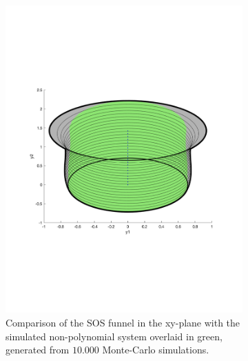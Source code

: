 \begin{figure}
  \begin{subfigure}{0.5\textwidth}
    \includegraphics[trim={0cm 6cm 0cm 6cm},
    width=\textwidth]{figures/method/FunnelSim1}
    \caption{Comparison of the \ac{SOS} funnel in the xy-plane with the
      simulated non-polynomial system overlaid in green, generated from
      \(10.000\) Monte-Carlo simulations.}
  \end{subfigure}%
  \quad
  \begin{subfigure}{0.5\textwidth}

\end{subfigure}
\end{figure}
